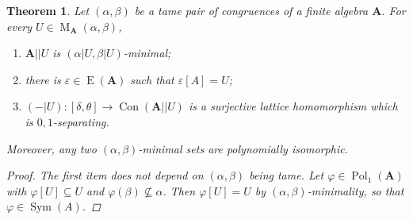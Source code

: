 \documentclass{amsart}
\theoremstyle{plain}
\newtheorem{theorem}{Theorem}[section]
\theoremstyle{definition}
\theoremstyle{remark}
\def\phi{\varphi}
\def\epsilon{\varepsilon}
\DeclareMathOperator{\Con}{Con}
\DeclareMathOperator{\Pol}{Pol}
\DeclareMathOperator{\Sym}{Sym}
\DeclareMathOperator{\Id}{E}
\DeclareMathOperator{\M}{M}
\begin{document}
\begin{theorem}
    Let $(\alpha, \beta)$ be a tame pair of congruences of a finite algebra $\mathbf{A}$.
    For every $U \in \M_{\mathbf{A}}(\alpha, \beta)$, 
    \begin{enumerate} 
        \item $\mathbf{A}||U$ is $(\alpha|U, \beta|U)$-minimal;
        \item there  is $\epsilon \in \Id(\mathbf{A})$ such that $\epsilon[A]=U$; 
        \item $(-|U): [\delta, \theta] \to \Con(\mathbf{A}||U)$ is a surjective lattice homomorphism which is $0,1$-separating.
    \end{enumerate}
    Moreover, any two $(\alpha, \beta)$-minimal sets are polynomially isomorphic. 
    \begin{proof}
        The first item does not depend on $(\alpha, \beta)$ being tame. 
        Let $\phi \in \Pol_1(\mathbf{A})$ with $\phi[U] \subseteq U$ and $\phi(\beta) \nsubseteq \alpha$. 
        Then $\phi[U]=U$ by $(\alpha, \beta)$-minimality, so that $\phi \in \Sym(A)$. 


\end{proof}
\end{theorem}
\end{document}
